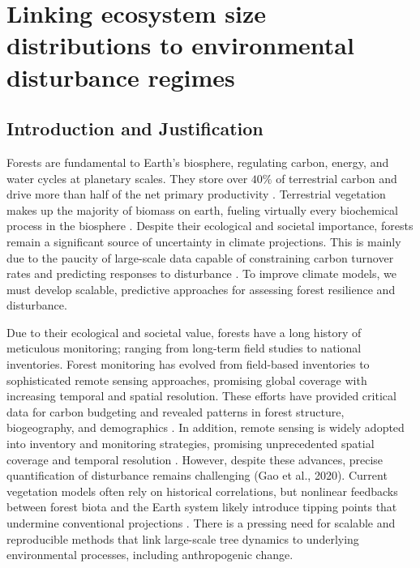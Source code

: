 \chapter{Linking ecosystem size distributions to environmental disturbance regimes}

\section{Introduction and Justification}

Forests are fundamental to Earth's biosphere, regulating carbon, energy, and water cycles at planetary scales. They store over $40\%$ of terrestrial carbon and drive more than half of the net primary productivity \cite{bonan_forests_2008, pan_large_2011}. Terrestrial vegetation makes up the majority of biomass on earth, fueling virtually every biochemical process in the biosphere \cite{bar-on_biomass_2018}. Despite their ecological and societal importance, forests remain a significant source of uncertainty in climate projections. This is mainly due to the paucity of large-scale data capable of constraining carbon turnover rates and predicting responses to disturbance \cite{doughty_tropical_2023, friedlingstein_global_2023, pugh_understanding_2020}. To improve climate models, we must develop scalable, predictive approaches for assessing forest resilience and disturbance.

Due to their ecological and societal value, forests have a long history of meticulous monitoring; ranging from long-term field studies to national inventories. Forest monitoring has evolved from field-based inventories to sophisticated remote sensing approaches, promising global coverage with increasing temporal and spatial resolution. These efforts have provided critical data for carbon budgeting and revealed patterns in forest structure, biogeography, and demographics \cite{duncanson_assessing_2015,friedlingstein_global_2023}. In addition, remote sensing is widely adopted into inventory and monitoring strategies, promising unprecedented spatial coverage and temporal resolution \cite{fassnacht_remote_2024, duncanson_aboveground_2022}. However, despite these advances, precise quantification of disturbance remains challenging (Gao et al., 2020). Current vegetation models often rely on historical correlations, but nonlinear feedbacks between forest biota and the Earth system likely introduce tipping points that undermine conventional projections \cite{dietz_economic_2021, lenton_environmental_2013}. There is a pressing need for scalable and reproducible methods that link large-scale tree dynamics to underlying environmental processes, including anthropogenic change. 

